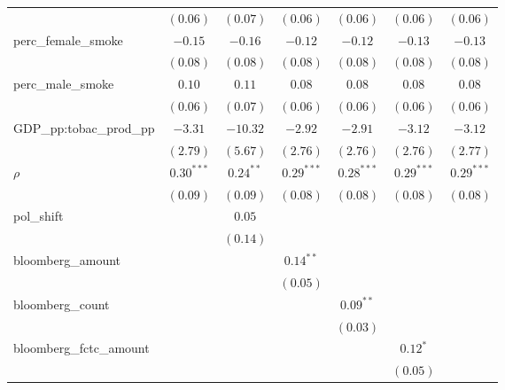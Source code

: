 \begin{table}[!h]
\begin{center}
\begin{tabular}{l c c c c c c }
                        & $(0.06)$     & $(0.07)$    & $(0.06)$     & $(0.06)$     & $(0.06)$     & $(0.06)$     \\
perc\_female\_smoke     & $-0.15$      & $-0.16$     & $-0.12$      & $-0.12$      & $-0.13$      & $-0.13$      \\
                        & $(0.08)$     & $(0.08)$    & $(0.08)$     & $(0.08)$     & $(0.08)$     & $(0.08)$     \\
perc\_male\_smoke       & $0.10$       & $0.11$      & $0.08$       & $0.08$       & $0.08$       & $0.08$       \\
                        & $(0.06)$     & $(0.07)$    & $(0.06)$     & $(0.06)$     & $(0.06)$     & $(0.06)$     \\
GDP\_pp:tobac\_prod\_pp & $-3.31$      & $-10.32$    & $-2.92$      & $-2.91$      & $-3.12$      & $-3.12$      \\
                        & $(2.79)$     & $(5.67)$    & $(2.76)$     & $(2.76)$     & $(2.76)$     & $(2.77)$     \\
$\rho$                  & $0.30^{***}$ & $0.24^{**}$ & $0.29^{***}$ & $0.28^{***}$ & $0.29^{***}$ & $0.29^{***}$ \\
                        & $(0.09)$     & $(0.09)$    & $(0.08)$     & $(0.08)$     & $(0.08)$     & $(0.08)$     \\
pol\_shift              &              & $0.05$      &              &              &              &              \\
                        &              & $(0.14)$    &              &              &              &              \\
bloomberg\_amount       &              &             & $0.14^{**}$  &              &              &              \\
                        &              &             & $(0.05)$     &              &              &              \\
bloomberg\_count        &              &             &              & $0.09^{**}$  &              &              \\
                        &              &             &              & $(0.03)$     &              &              \\
bloomberg\_fctc\_amount &              &             &              &              & $0.12^{*}$   &              \\
                        &              &             &              &              & $(0.05)$     &              \\

\end{tabular}
\end{center}
\end{table}
